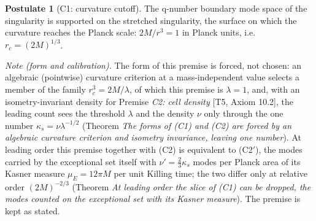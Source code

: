 \documentclass[11pt]{article}
\theoremstyle{definition}
\newtheorem{postulate}[theorem]{Postulate}
\theoremstyle{plain}
\begin{document}
\begin{postulate}[C1: curvature cutoff]\label{c:singularity.c1-curvature-cutoff}
The q-number boundary mode space of the singularity is supported on the stretched singularity, the surface on which the curvature reaches the Planck scale: $2M/r^3 = 1$ in Planck units, i.e.\ $r_c = (2M)^{1/3}$.

\emph{Note (form and calibration).} The form of this premise is forced, not chosen: an algebraic (pointwise) curvature criterion at a mass-independent value selects a member of the family $r_c^{3} = 2M/\lambda$, of which this premise is $\lambda = 1$, and, with an isometry-invariant density for Premise \emph{C2: cell density} [T5, Axiom 10.2], the leading count sees the threshold $\lambda$ and the density $\nu$ only through the one number $\kappa_{s} = \nu\lambda^{-1/2}$ (Theorem \emph{The forms of (C1) and (C2) are forced by an algebraic curvature criterion and isometry invariance, leaving one number}). At leading order this premise together with (C2) is equivalent to (C2$'$), the modes carried by the exceptional set itself with $\nu' = \tfrac23\kappa_{s}$ modes per Planck area of its Kasner measure $\mu_{E} = 12\pi M$ per unit Killing time; the two differ only at relative order $(2M)^{-2/3}$ (Theorem \emph{At leading order the slice of (C1) can be dropped, the modes counted on the exceptional set with its Kasner measure}). The premise is kept as stated.


\end{postulate}
\end{document}
